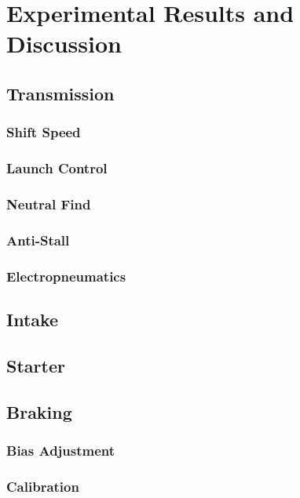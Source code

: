 \chapter{Experimental Results and Discussion}


\section{Transmission}


\subsection{Shift Speed}


\subsection{Launch Control}


\subsection{Neutral Find}


\subsection{Anti-Stall}


\subsection{Electropneumatics}


\section{Intake}


\section{Starter}


\section{Braking}


\subsection{Bias Adjustment}


\subsection{Calibration}


